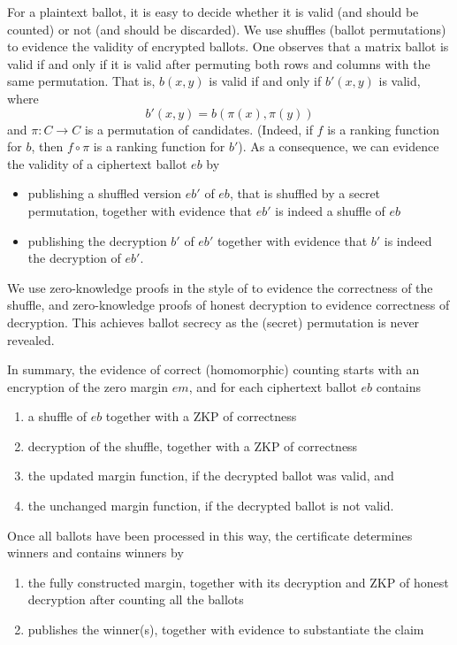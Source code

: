 \documentclass{llncs}
\newcounter{mycnt}
\newcommand{\encb}{\mathit{eb}}
\newcommand{\encm}{\mathit{em}}
\begin{document}
For a plaintext ballot, it is easy to decide whether it is
valid (and should be counted) or not (and should be discarded). We
use shuffles (ballot permutations) to evidence the validity of
encrypted ballots. One observes that a matrix ballot is valid if and
only if it is valid after permuting both rows and columns with the
same permutation. That is, $b(x,y)$ is valid if and only if $b'(x,y)$
is valid, where
\[ b'(x,y) = b(\pi(x), \pi(y)) \]
and $\pi: C \to C$ is a permutation of candidates. (Indeed, if $f$
is a ranking function for $b$, then $f \circ \pi$ is a ranking
function for $b'$). As a consequence, we can evidence the validity
of a ciphertext ballot $\encb$ by
\begin{itemize}
  \item publishing a shuffled version $\encb'$ of $\encb$, that is
  shuffled by a secret permutation, together with
  evidence that $\encb'$ is indeed a shuffle of $\encb$
  \item publishing the decryption $b'$ of $\encb'$ together with
  evidence that $b'$ is indeed the decryption of $\encb'$.
\end{itemize}

\noindent
We use zero-knowledge proofs in the style of \cite{DBLP:conf/africacrypt/TereliusW10}
to evidence the correctness of the shuffle, and zero-knowledge
proofs of honest decryption \cite{DBLP:conf/crypto/ChaumP92} to evidence
correctness of decryption. This achieves ballot secrecy as
the (secret) permutation is never revealed.

In summary, the evidence of correct (homomorphic) counting starts
with an encryption of the zero margin $\encm$, and for each
ciphertext ballot $\encb$ contains
\begin{enumerate}
\item \label{it:shuff} a shuffle of $\encb$ together with a ZKP of 
correctness
\item decryption of the  shuffle, together with a ZKP of
correctness
\item \label{it:upd-marg} the updated margin function, if the decrypted ballot
was valid, and
\item the unchanged margin function, if the decrypted
ballot is not valid.
\setcounter{mycnt}{\value{enumi}}
\end{enumerate}
Once all ballots have been processed in this way, the certificate
determines winners and contains
winners by
\begin{enumerate}
\setcounter{enumi}{\value{mycnt}}
\item \label{it:pub-dm} the fully constructed margin, together with its decryption  
  and ZKP of honest decryption after counting all the ballots     
\item publishes the winner(s), together with evidence to substantiate the
    claim
\end{enumerate}
\end{document}

